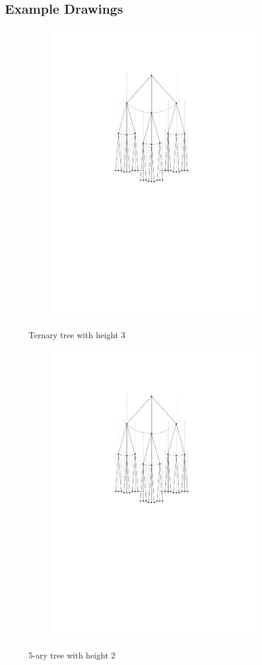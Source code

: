 \subsection{Example Drawings}
\begin{figure}[H]
	\centering
	\begin{subfigure}{\textwidth}
		\centering
		\includegraphics[page=1,width=0.6\linewidth]{graphics/k-ary_tree_example_drawings.pdf}
	\end{subfigure}
	\caption{Ternary tree with height 3}\label{im:3-ary_tree}
\end{figure}
\begin{figure}[H]
	\centering
	\begin{subfigure}{\textwidth}
		\centering
		\includegraphics[page=2,width=0.6\linewidth]{graphics/k-ary_tree_example_drawings.pdf}
	\end{subfigure}
	\caption{5-ary tree with height 2}\label{im:4-ary_tree}
\end{figure}
